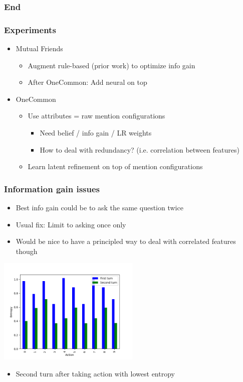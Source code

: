 \documentclass{beamer}
\begin{document}
\begin{frame}
\frametitle{End}
\end{frame}
\begin{frame}
\frametitle{Experiments}
\begin{itemize}
\item Mutual Friends
    \begin{itemize}
    \item Augment rule-based (prior work) to optimize info gain
    \item After OneCommon: Add neural on top
    \end{itemize}
\item OneCommon
    \begin{itemize}
    \item Use attributes = raw mention configurations
        \begin{itemize}
        \item Need belief / info gain / LR weights
        \item How to deal with redundancy? (i.e. correlation between features)
        \end{itemize}
    \item Learn latent refinement on top of mention configurations
    \end{itemize}
\end{itemize}
\end{frame}

\begin{frame}
\frametitle{Information gain issues}
\begin{itemize}
\item Best info gain could be to ask the same question twice
\item Usual fix: Limit to asking once only
\item Would be nice to have a principled way to deal with correlated
    features though
\end{itemize}
\centering
\includegraphics[height=2in]{src/entropy.png}
\begin{itemize}
\item Second turn after taking action with lowest entropy
\end{itemize}
\end{frame}
\end{document}
